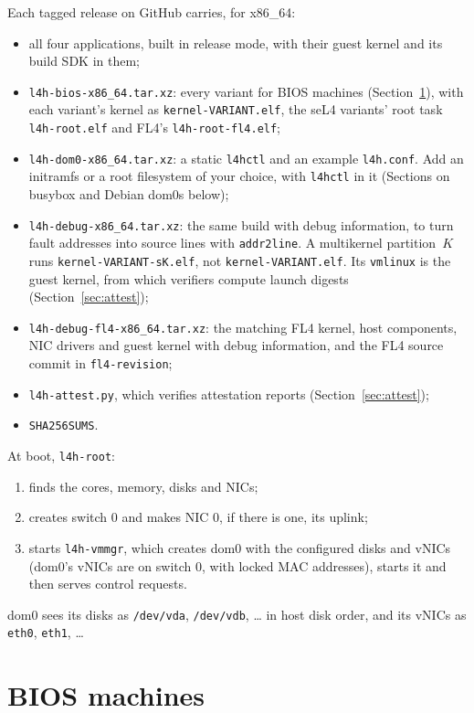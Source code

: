 \documentclass[11pt,a4paper]{report}
\newcommand{\cmd}[1]{\texttt{#1}}
\newcommand{\file}[1]{\texttt{#1}}
\begin{document}
Each tagged release on GitHub carries, for x86\_64:
\begin{itemize}
  \item all four applications, built in release mode, with their guest kernel
        and its build SDK in them;
  \item \file{l4h-bios-x86\_64.tar.xz}: every variant for BIOS machines
        (Section~\ref{sec:bios}), with each variant's kernel as
        \file{kernel-VARIANT.elf}, the seL4 variants' root task
        \file{l4h-root.elf} and FL4's \file{l4h-root-fl4.elf};
  \item \file{l4h-dom0-x86\_64.tar.xz}: a static \cmd{l4hctl} and an
        example \file{l4h.conf}. Add an initramfs or a root filesystem of
        your choice, with \cmd{l4hctl} in it (Sections on busybox and Debian
        dom0s below);
  \item \file{l4h-debug-x86\_64.tar.xz}: the same build with debug
        information, to turn fault addresses into source lines with
        \cmd{addr2line}. A multikernel partition~$K$ runs
        \file{kernel-VARIANT-sK.elf}, not \file{kernel-VARIANT.elf}. Its \file{vmlinux} is the guest kernel, from
        which verifiers compute launch digests
        (Section~\ref{sec:attest});
  \item \file{l4h-debug-fl4-x86\_64.tar.xz}: the matching FL4 kernel,
        host components, NIC drivers and guest kernel with debug information,
        and the FL4 source commit in \file{fl4-revision};
  \item \file{l4h-attest.py}, which verifies attestation reports
        (Section~\ref{sec:attest});
  \item \file{SHA256SUMS}.
\end{itemize}

At boot, \texttt{l4h-root}:
\begin{enumerate}
  \item finds the cores, memory, disks and NICs;
  \item creates switch 0 and makes NIC 0, if there is one, its uplink;
  \item starts \texttt{l4h-vmmgr}, which creates dom0 with the configured
        disks and vNICs (dom0's vNICs are on switch 0, with locked MAC
        addresses), starts it and then serves control requests.
\end{enumerate}
dom0 sees its disks as \file{/dev/vda}, \file{/dev/vdb}, \ldots{} in host
disk order, and its vNICs as \texttt{eth0}, \texttt{eth1}, \ldots

\section{BIOS machines}
\label{sec:bios}
\end{document}
